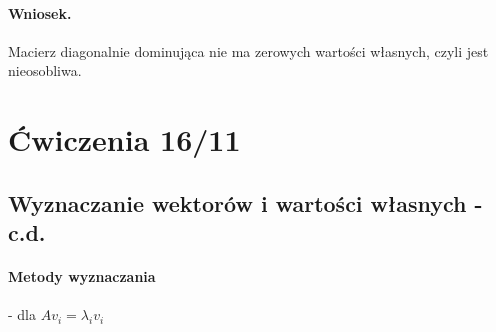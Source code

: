 \documentclass{article}
\begin{document}
\paragraph{Wniosek.} Macierz diagonalnie dominująca nie ma zerowych wartości własnych, czyli jest nieosobliwa.

\section{Ćwiczenia 16/11}
\subsection{Wyznaczanie wektorów i wartości własnych - c.d.}
\paragraph{Metody wyznaczania} - dla $ Av_i=\lambda_iv_i $
\end{document}
